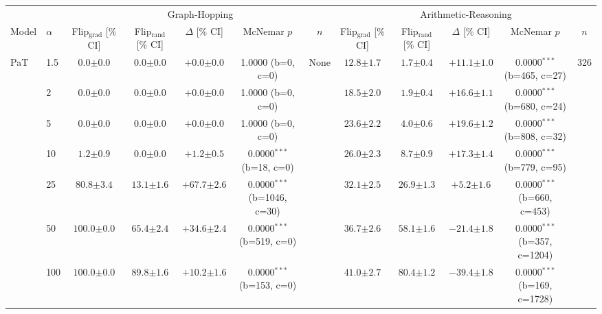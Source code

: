 \begin{table}[h!]
\centering
\tiny
\setlength{\tabcolsep}{3pt}
\begin{tabular}{l l | cccc c | cccc c}
\toprule
& & \multicolumn{5}{c}{Graph-Hopping} & \multicolumn{5}{c}{Arithmetic-Reasoning} \\
\cmidrule(lr){3-7} \cmidrule(lr){8-12}
Model & $\alpha$ & Flip$_{\text{grad}}$ [\% CI] & Flip$_{\text{rand}}$ [\% CI] & $\Delta$ [\% CI] & McNemar $p$ & $n$ & Flip$_{\text{grad}}$ [\% CI] & Flip$_{\text{rand}}$ [\% CI] & $\Delta$ [\% CI] & McNemar $p$ & $n$ \\
\midrule
PaT & 1.5 & $0.0 {\scriptstyle \pm 0.0}$ & $0.0 {\scriptstyle \pm 0.0}$ & $+0.0 {\scriptstyle \pm 0.0}$ & 1.0000 (b=0, c=0) & None & $12.8 {\scriptstyle \pm 1.7}$ & $1.7 {\scriptstyle \pm 0.4}$ & $+11.1 {\scriptstyle \pm 1.0}$ & 0.0000$^{***}$ (b=465, c=27) & 326 \\
 & 2 & $0.0 {\scriptstyle \pm 0.0}$ & $0.0 {\scriptstyle \pm 0.0}$ & $+0.0 {\scriptstyle \pm 0.0}$ & 1.0000 (b=0, c=0) &  & $18.5 {\scriptstyle \pm 2.0}$ & $1.9 {\scriptstyle \pm 0.4}$ & $+16.6 {\scriptstyle \pm 1.1}$ & 0.0000$^{***}$ (b=680, c=24) &  \\
 & 5 & $0.0 {\scriptstyle \pm 0.0}$ & $0.0 {\scriptstyle \pm 0.0}$ & $+0.0 {\scriptstyle \pm 0.0}$ & 1.0000 (b=0, c=0) &  & $23.6 {\scriptstyle \pm 2.2}$ & $4.0 {\scriptstyle \pm 0.6}$ & $+19.6 {\scriptstyle \pm 1.2}$ & 0.0000$^{***}$ (b=808, c=32) &  \\
 & 10 & $1.2 {\scriptstyle \pm 0.9}$ & $0.0 {\scriptstyle \pm 0.0}$ & $+1.2 {\scriptstyle \pm 0.5}$ & 0.0000$^{***}$ (b=18, c=0) &  & $26.0 {\scriptstyle \pm 2.3}$ & $8.7 {\scriptstyle \pm 0.9}$ & $+17.3 {\scriptstyle \pm 1.4}$ & 0.0000$^{***}$ (b=779, c=95) &  \\
 & 25 & $80.8 {\scriptstyle \pm 3.4}$ & $13.1 {\scriptstyle \pm 1.6}$ & $+67.7 {\scriptstyle \pm 2.6}$ & 0.0000$^{***}$ (b=1046, c=30) &  & $32.1 {\scriptstyle \pm 2.5}$ & $26.9 {\scriptstyle \pm 1.3}$ & $+5.2 {\scriptstyle \pm 1.6}$ & 0.0000$^{***}$ (b=660, c=453) &  \\
 & 50 & $100.0 {\scriptstyle \pm 0.0}$ & $65.4 {\scriptstyle \pm 2.4}$ & $+34.6 {\scriptstyle \pm 2.4}$ & 0.0000$^{***}$ (b=519, c=0) &  & $36.7 {\scriptstyle \pm 2.6}$ & $58.1 {\scriptstyle \pm 1.6}$ & $-21.4 {\scriptstyle \pm 1.8}$ & 0.0000$^{***}$ (b=357, c=1204) &  \\
 & 100 & $100.0 {\scriptstyle \pm 0.0}$ & $89.8 {\scriptstyle \pm 1.6}$ & $+10.2 {\scriptstyle \pm 1.6}$ & 0.0000$^{***}$ (b=153, c=0) &  & $41.0 {\scriptstyle \pm 2.7}$ & $80.4 {\scriptstyle \pm 1.2}$ & $-39.4 {\scriptstyle \pm 1.8}$ & 0.0000$^{***}$ (b=169, c=1728) &  \\

\end{tabular}
\end{table}
